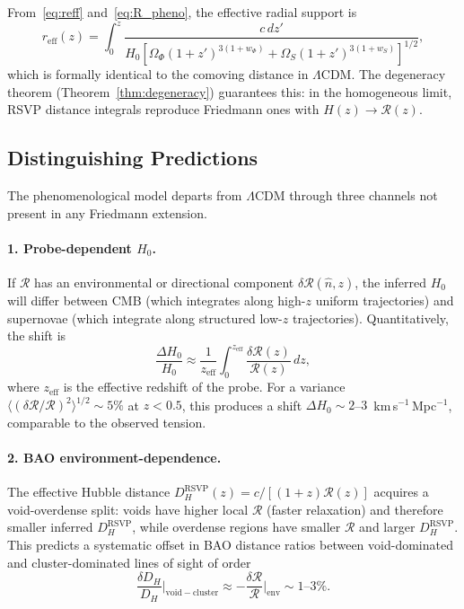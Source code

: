 \documentclass[12pt,a4paper]{article}
\theoremstyle{remark}
\newcommand{\Rcal}{\mathcal{R}}
\newcommand{\reff}{r_{\mathrm{eff}}}
\newcommand{\DHr}{D_H^{\mathrm{RSVP}}}
\begin{document}
From~\eqref{eq:reff} and~\eqref{eq:R_pheno}, the effective radial support is
\begin{equation}
\reff(z) = \int_0^z \frac{c\, dz'}{H_0\left[\Omega_\Phi(1+z')^{3(1+w_\Phi)}
+ \Omega_S(1+z')^{3(1+w_S)}\right]^{1/2}},
\end{equation}
which is formally identical to the comoving distance in $\Lambda$CDM. The
degeneracy theorem (Theorem~\ref{thm:degeneracy}) guarantees this: in the
homogeneous limit, RSVP distance integrals reproduce Friedmann ones with
$H(z) \to \Rcal(z)$.

\subsection{Distinguishing Predictions}

The phenomenological model departs from $\Lambda$CDM through three channels
not present in any Friedmann extension.

\paragraph{1. Probe-dependent $H_0$.}
If $\Rcal$ has an environmental or directional component
$\delta\Rcal(\hat{n}, z)$, the inferred $H_0$ will differ between CMB (which
integrates along high-$z$ uniform trajectories) and supernovae (which integrate
along structured low-$z$ trajectories). Quantitatively, the shift is
\begin{equation}
\frac{\Delta H_0}{H_0} \approx \frac{1}{z_{\mathrm{eff}}}
\int_0^{z_{\mathrm{eff}}} \frac{\delta\Rcal(z)}{\Rcal(z)}\, dz,
\end{equation}
where $z_{\mathrm{eff}}$ is the effective redshift of the probe. For a
variance $\langle(\delta\Rcal/\Rcal)^2\rangle^{1/2} \sim 5\%$ at $z < 0.5$,
this produces a shift $\Delta H_0 \sim 2$--$3$~km\,s$^{-1}$\,Mpc$^{-1}$,
comparable to the observed tension.

\paragraph{2. BAO environment-dependence.}
The effective Hubble distance $\DHr(z) = c/[(1+z)\Rcal(z)]$ acquires a
void-overdense split: voids have higher local $\Rcal$ (faster relaxation) and
therefore smaller inferred $\DHr$, while overdense regions have smaller $\Rcal$
and larger $\DHr$. This predicts a systematic offset in BAO distance ratios
between void-dominated and cluster-dominated lines of sight of order
\begin{equation}
\frac{\delta D_H}{D_H}\bigg|_{\mathrm{void-cluster}}
\approx -\frac{\delta\Rcal}{\Rcal}\bigg|_{\mathrm{env}} \sim 1\text{--}3\%.
\end{equation}
\end{document}
